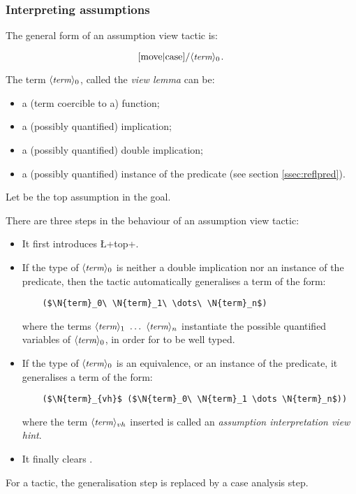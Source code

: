 \subsubsection*{Interpreting assumptions}
\label{sssec:hypview}
The general form of an assumption view tactic is:

$$[\C{move}|\C{case}]\C{/}\N{term}_0\C{.}$$

The term $\langle\mbox{\itshape\rmfamily\small term}\rangle_0$, called the \emph{view lemma} can be:
\begin{itemize}
\item a (term coercible to a) function;
\item a (possibly quantified) implication;
\item a (possibly quantified) double implication;
\item a (possibly quantified) instance of the  predicate
  (see section \ref{ssec:reflpred}).
\end{itemize}

Let  be the top assumption in the goal.

There are three steps in the behaviour of an assumption view tactic:
\begin{itemize}
\item It first introduces \L+top+.
\item If the type of $\langle\mbox{\itshape\rmfamily\small term}\rangle_0$ is neither a double implication nor
  an instance of the  predicate, then the tactic
  automatically generalises a term of the form:
  \begin{lstlisting}
    ($\N{term}_0\ \N{term}_1\ \dots\ \N{term}_n$)
  \end{lstlisting}
  where the terms $\N{term}_1\ \dots\ \N{term}_n$ instantiate the
  possible quantified variables of $\langle\mbox{\itshape\rmfamily\small term}\rangle_0$, in order for
   to be well typed.
\item If the type of $\langle\mbox{\itshape\rmfamily\small term}\rangle_0$ is an equivalence, or
  an instance of the  predicate, it generalises a term of
  the form:
  \begin{lstlisting}
    ($\N{term}_{vh}$ ($\N{term}_0\ \N{term}_1 \dots \N{term}_n$))
  \end{lstlisting}
  where the term $\langle\mbox{\itshape\rmfamily\small term}\rangle_{vh}$ inserted is called an
  \emph{assumption interpretation view hint}.
\item It finally clears .
\end{itemize}
For a  tactic, the generalisation step is
replaced by a case analysis step.

